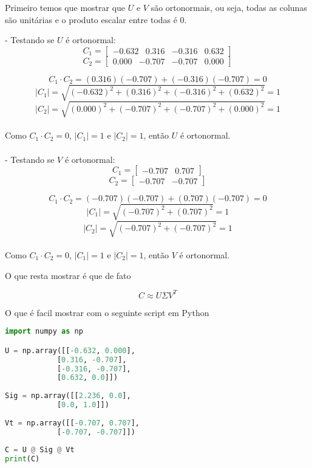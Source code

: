 \documentclass[11pt]{article}
\begin{document}
\begin{exerc}
\begin{enumerate}
Primeiro temos que mostrar que $U$ e $V$ são ortonormais, ou seja, todas as colunas são unitárias e o produto escalar entre todas é 0.

- Testando se $U$ é ortonormal:
\[
C_1 = 
\begin{bmatrix}
    -0.632 & 0.316 & -0.316 & 0.632
\end{bmatrix}
\]
\[
C_2 =
\begin{bmatrix}
    0.000 & -0.707 & -0.707 & 0.000
\end{bmatrix}
\]

$$C_1 \cdot C_2 = (0.316)(-0.707) + (-0.316)(-0.707) = 0$$
\[
|C_1| = 
\sqrt{ (-0.632)^2 + (0.316)^2 + (-0.316)^2 + (0.632)^2}
= 1
\]
\[
|C_2| = 
\sqrt{ (0.000)^2 + (-0.707)^2 + (-0.707)^2 + (0.000)^2}
= 1
\]\\
Como $C_1 \cdot C_2 = 0$, $|C_1| = 1$ e $|C_2| = 1$, então $U$ é ortonormal.
\\\\
- Testando se $V$ é ortonormal:
\[
C_1 = 
\begin{bmatrix}
    -0.707 & 0.707
\end{bmatrix}
\]
\[
C_2 =
\begin{bmatrix}
    -0.707 & -0.707
\end{bmatrix}
\]

$$C_1 \cdot C_2 = (-0.707)(-0.707) + (0.707)(-0.707) = 0$$
\[
|C_1| = 
\sqrt{ (-0.707)^2 + (0.707)^2}
= 1
\]
\[
|C_2| = 
\sqrt{ (-0.707)^2 + (-0.707)^2 }
= 1
\]\\
Como $C_1 \cdot C_2 = 0$, $|C_1| = 1$ e $|C_2| = 1$, então $V$ é ortonormal.

\newpage


O que resta mostrar é que de fato

$$C \approx U \Sigma V^T$$

O que é facil mostrar com o seguinte script em Python

\begin{lstlisting}[language=Python]
import numpy as np

U = np.array([[-0.632, 0.000],
			[0.316, -0.707],
			[-0.316, -0.707],
 			[0.632, 0.0]])
              
Sig = np.array([[2.236, 0.0],
			[0.0, 1.0]])
				
Vt = np.array([[-0.707, 0.707],
			[-0.707, -0.707]])
			   
C = U @ Sig @ Vt
print(C)
\end{lstlisting}


\end{enumerate}
\end{exerc}
\end{document}
